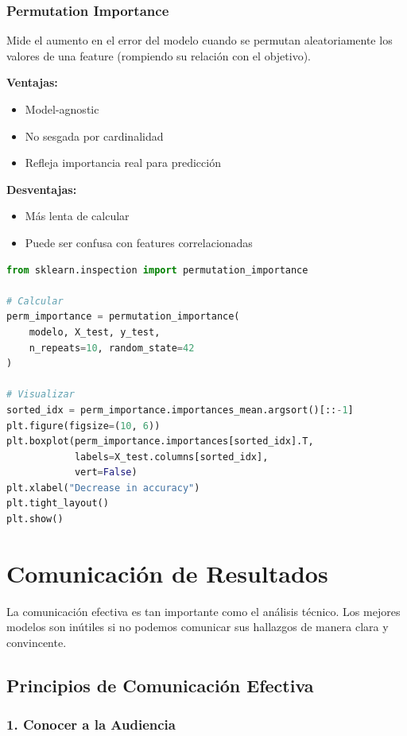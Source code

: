 \documentclass[11pt,a4paper]{article}
\begin{document}
\subsubsection{Permutation Importance}

Mide el aumento en el error del modelo cuando se permutan aleatoriamente los valores de una feature (rompiendo su relación con el objetivo).

\textbf{Ventajas:}
\begin{itemize}
\item Model-agnostic
\item No sesgada por cardinalidad
\item Refleja importancia real para predicción
\end{itemize}

\textbf{Desventajas:}
\begin{itemize}
\item Más lenta de calcular
\item Puede ser confusa con features correlacionadas
\end{itemize}

\begin{lstlisting}[language=Python]
from sklearn.inspection import permutation_importance

# Calcular
perm_importance = permutation_importance(
    modelo, X_test, y_test,
    n_repeats=10, random_state=42
)

# Visualizar
sorted_idx = perm_importance.importances_mean.argsort()[::-1]
plt.figure(figsize=(10, 6))
plt.boxplot(perm_importance.importances[sorted_idx].T,
            labels=X_test.columns[sorted_idx],
            vert=False)
plt.xlabel("Decrease in accuracy")
plt.tight_layout()
plt.show()
\end{lstlisting}

\section{Comunicación de Resultados}

La comunicación efectiva es tan importante como el análisis técnico. Los mejores modelos son inútiles si no podemos comunicar sus hallazgos de manera clara y convincente.

\subsection{Principios de Comunicación Efectiva}

\subsubsection{1. Conocer a la Audiencia}
\end{document}
